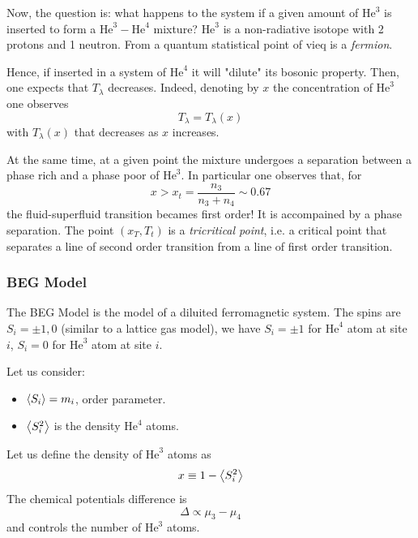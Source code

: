 \documentclass[../main/main.tex]{subfiles}
\begin{document}
Now, the question is: what happens to the system if a given amount of \( \text{He}^3 \) is inserted to form a \( \text{He}^3- \text{He}^4  \) mixture?
\( \text{He}^3 \) is a non-radiative isotope with 2 protons and 1 neutron. From a quantum statistical point of vieq is a \emph{fermion}.

Hence, if inserted in a system of \( \text{He}^4 \) it will "dilute" its bosonic property. Then, one expects that \( T_ \lambda  \) decreases. Indeed, denoting by \( x \) the concentration of \( \text{He}^3 \)  one observes
\begin{equation}
  T_{\lambda} = T_ \lambda (x)
\end{equation}
with \( T_ \lambda (x) \)  that decreases as \( x \) increases.

At the same time, at a given point the mixture undergoes a separation between a phase rich and a phase poor of \( \text{He}^3 \). In particular one observes that, for
\begin{equation}
  x > x_t = \frac{n_3}{n_3+n_4} \sim 0.67
\end{equation}
the fluid-superfluid transition becames first order! It is accompained by a phase separation. The point \( (x_T,T_t) \) is a \emph{tricritical point}, i.e. a critical point that separates a line of second order transition from a line of first order transition.
\subsubsection{BEG Model}
The BEG Model is the model of a diluited ferromagnetic system.
The spins are \( S_i = \pm 1,0 \) (similar to a lattice gas model), we have \( S_i = \pm 1 \) for \( \text{He}^4 \) atom at site \( i \), \( S_i = 0 \) for \( \text{He}^3 \) atom at site \( i \).

Let us consider:
\begin{itemize}
\item \( \expval{S_i} = m_i  \), order parameter.
\item \( \expval{S_i^2}  \) is the density \( \text{He}^4 \) atoms.
\end{itemize}
Let us define the density of \( \text{He}^3 \) atoms as
\begin{equation}
  x \equiv 1 - \expval{S_i^2}
\end{equation}
The chemical potentials difference is
\begin{equation}
  \Delta \propto \mu _3 - \mu _4
\end{equation}
and controls the number of \( \text{He}^3 \) atoms.
\end{document}
